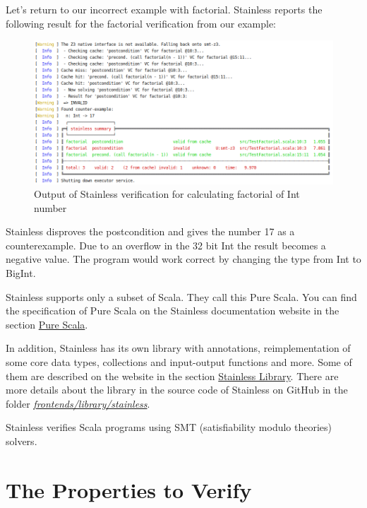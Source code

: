 Let's return to our incorrect example with factorial.
Stainless reports the following result for the factorial verification from our example:
\begin{figure}[H]
	\centering
		\includegraphics[scale=0.5]{images/output1.png}
	\caption{Output of Stainless verification for calculating factorial of Int number}
	\label{fig:output1}
\end{figure}

Stainless disproves the postcondition and gives the number 17 as a counterexample.
Due to an overflow in the 32 bit Int the result becomes a negative value.
The program would work correct by changing the type from Int to BigInt.

Stainless supports only a subset of Scala.
They call this Pure Scala.
You can find the specification of Pure Scala on the Stainless documentation website \cite{Stainless:documentation} in the section \href{https://epfl-lara.github.io/stainless/purescala.html}{Pure Scala}.

In addition, Stainless has its own library with annotations, reimplementation of some core data types, collections and input-output functions and more.
Some of them are described on the website in the section \href{https://epfl-lara.github.io/stainless/library.html}{Stainless Library}.
There are more details about the library in the source code of Stainless on GitHub \cite{Stainless:github} in the folder \href{https://github.com/epfl-lara/stainless/tree/master/frontends/library/stainless}{\textit{frontends/library/stainless}}.

Stainless verifies Scala programs using SMT (satisfiability modulo theories) solvers. 


\section{The Properties to Verify}

